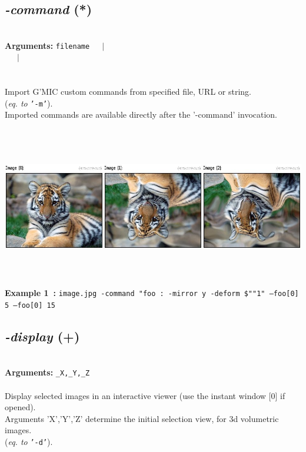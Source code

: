 \documentclass[a4paper,11pt,twoside]{book}
\begin{document}
\subsection{\emph{-command} (*)}\vspace*{-0.5em}
~\\\textbf{Arguments: } 
{\small \texttt{filename}}~~~$|$\\
~~~$|$\\
\\~\\
Import G'MIC custom commands from specified file, URL or string.
~\\(\emph{eq. to} {\small \texttt{'-m'}}).
~\\Imported commands are available directly after the '-command' invocation.
\begin{center}\includegraphics[keepaspectratio=true,height=7cm,width=\textwidth]{img/gmic_def1.jpg}\\
{\footnotesize \textbf{Example 1~:} \texttt{image.jpg -command "foo : -mirror y -deform \$""1" --foo[0] 5 --foo[0] 15}}
\end{center}

\subsection{\emph{-display} (+)}\vspace*{-0.5em}
~\\\textbf{Arguments: } 
{\small \texttt{\_X,\_Y,\_Z}}\\~\\
Display selected images in an interactive viewer (use the instant window [0] if opened).
~\\Arguments 'X','Y','Z' determine the initial selection view, for 3d volumetric images.
~\\(\emph{eq. to} {\small \texttt{'-d'}}).
\end{document}
